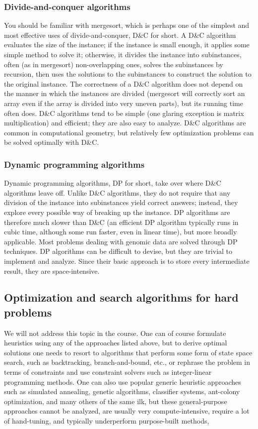 \documentclass{article}
\begin{document}
\subsubsection{Divide-and-conquer algorithms}
You should be familiar with mergesort, which is perhaps one of the simplest
and most effective uses of divide-and-conquer, D\&C for short.  A D\&C
algorithm evaluates the size of the instance; if the instance is small enough,
it applies some simple method to solve it; otherwise, it divides the instance
into subinstances, often (as in mergesort) non-overlapping ones, solves
the subinstances by recursion, then uses the solutions to the subinstances
to construct the solution to the original instance.  The correctness of
a D\&C algorithm does not depend on the manner in which the instances are
divided (mergesort will correctly sort an array even if the array is divided
into very uneven parts), but its running time often does.  D\&C algorithms
tend to be simple (one glaring exception is matrix multiplication) and
efficient; they are also easy to analyze.  D\&C algorithms
are common in computational geometry, but relatively few optimization
problems can be solved optimally with D\&C.

\subsubsection{Dynamic programming algorithms}
Dynamic programming algorithms, DP for short, take over where D\&C algorithms
leave off.  Unlike D\&C algorithms, they do not require that any division of
the instance into subinstances yield correct answers; instead, they explore
every possible way of breaking up the instance.  DP algorithms are therefore
much slower than D\&C (an efficient DP algorithm typically runs in cubic time,
although some run faster, even in linear time), but more broadly applicable.
Most problems dealing with genomic data are solved through DP techniques.
DP algorithms can be difficult to devise, but they are trivial to implement
and analyze.  Since their basic approach is to store every intermediate result,
they are space-intensive.

\subsection{Optimization and search algorithms for hard problems}
We will not address this topic in the course.  One can of course formulate
heuristics using any of the approaches listed above, but to derive optimal
solutions one needs to resort to algorithms that perform some form of
state space search, such as backtracking, branch-and-bound, etc., or rephrase
the problem in terms of constraints and use constraint solvers such as
integer-linear programming methods.  One can also use popular generic
heuristic approaches such as simulated annealing, genetic algorithms,
classifier systems, ant-colony optimization, and many others of the same ilk,
but these general-purpose approaches cannot be analyzed, are usually very
compute-intensive, require a lot of hand-tuning, and typically underperform
purpose-built methods, 
\end{document}

